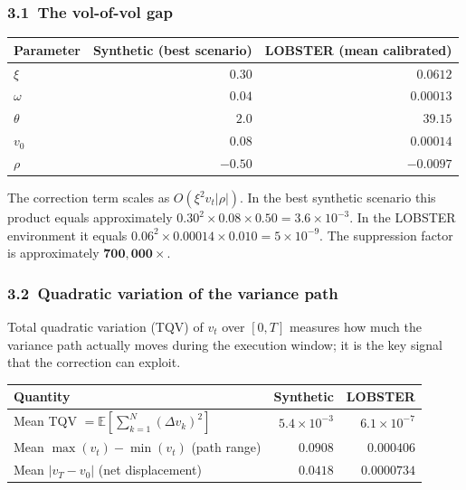 \documentclass[11pt]{article}
\begin{document}
\subsubsection*{3.1\ The vol-of-vol gap}

\begin{center}
\begin{tabular}{lrr}
\toprule
Parameter & Synthetic (best scenario) & LOBSTER (mean calibrated) \\
\midrule
$\xi$        & $0.30$           & $0.0612$ \\
$\omega$     & $0.04$           & $0.00013$ \\
$\theta$     & $2.0$            & $39.15$ \\
$v_0$        & $0.08$           & $0.00014$ \\
$\rho$       & $-0.50$          & $-0.0097$ \\
\bottomrule
\end{tabular}
\end{center}

The correction term scales as $O(\xi^2 v_t |\rho|)$.
In the best synthetic scenario this product equals approximately $0.30^2 \times 0.08 \times 0.50 = 3.6\times10^{-3}$.
In the LOBSTER environment it equals $0.06^2 \times 0.00014 \times 0.010 = 5\times10^{-9}$.
The suppression factor is approximately $\mathbf{700{,}000\times}$.

\subsubsection*{3.2\ Quadratic variation of the variance path}

Total quadratic variation (TQV) of $v_t$ over $[0,T]$ measures how much the variance path
actually moves during the execution window; it is the key signal that the correction
can exploit.

\begin{center}
\begin{tabular}{lrr}
\toprule
Quantity & Synthetic & LOBSTER \\
\midrule
Mean TQV $= \mathbb{E}\!\left[\sum_{k=1}^N (\Delta v_k)^2\right]$ &
  $5.4 \times 10^{-3}$ & $6.1 \times 10^{-7}$ \\
Mean $\max(v_t) - \min(v_t)$ (path range) & $0.0908$ & $0.000406$ \\
Mean $|v_T - v_0|$ (net displacement) & $0.0418$ & $0.0000734$ \\
\bottomrule
\end{tabular}
\end{center}
\end{document}
